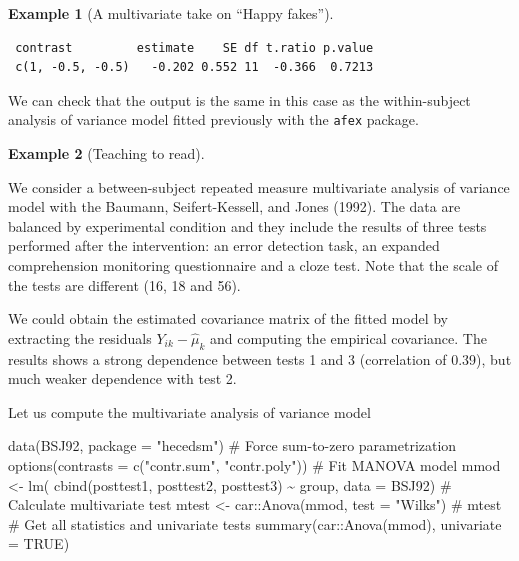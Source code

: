 \documentclass[
  11pt,
  letterpaper,
]{scrbook}
\newenvironment{Shaded}{\begin{snugshade}}{\end{snugshade}}
\newcommand{\AttributeTok}[1]{\textcolor[rgb]{0.40,0.45,0.13}{#1}}
\newcommand{\CommentTok}[1]{\textcolor[rgb]{0.37,0.37,0.37}{#1}}
\newcommand{\ConstantTok}[1]{\textcolor[rgb]{0.56,0.35,0.01}{#1}}
\newcommand{\FunctionTok}[1]{\textcolor[rgb]{0.28,0.35,0.67}{#1}}
\newcommand{\NormalTok}[1]{\textcolor[rgb]{0.00,0.23,0.31}{#1}}
\newcommand{\OtherTok}[1]{\textcolor[rgb]{0.00,0.23,0.31}{#1}}
\newcommand{\SpecialCharTok}[1]{\textcolor[rgb]{0.37,0.37,0.37}{#1}}
\newcommand{\StringTok}[1]{\textcolor[rgb]{0.13,0.47,0.30}{#1}}
\theoremstyle{definition}
\theoremstyle{definition}
\newtheorem{example}{Example}[chapter]
\theoremstyle{remark}
\begin{document}
\begin{example}[A multivariate take on ``Happy
fakes'']
\begin{verbatim}
 contrast         estimate    SE df t.ratio p.value
 c(1, -0.5, -0.5)   -0.202 0.552 11  -0.366  0.7213
\end{verbatim}

We can check that the output is the same in this case as the
within-subject analysis of variance model fitted previously with the
\texttt{afex} package.

\end{example}

\begin{example}[Teaching to
read]\protect\hypertarget{exm-baumann-multi}{}\label{exm-baumann-multi}

We consider a between-subject repeated measure multivariate analysis of
variance model with the Baumann, Seifert-Kessell, and Jones (1992). The
data are balanced by experimental condition and they include the results
of three tests performed after the intervention: an error detection
task, an expanded comprehension monitoring questionnaire and a cloze
test. Note that the scale of the tests are different (16, 18 and 56).

We could obtain the estimated covariance matrix of the fitted model by
extracting the residuals \(Y_{ik} - \widehat{\mu}_k\) and computing the
empirical covariance. The results shows a strong dependence between
tests 1 and 3 (correlation of 0.39), but much weaker dependence with
test 2.

Let us compute the multivariate analysis of variance model

\begin{Shaded}
\begin{Highlighting}[]
\FunctionTok{data}\NormalTok{(BSJ92, }\AttributeTok{package =} \StringTok{"hecedsm"}\NormalTok{)}
\CommentTok{\# Force sum{-}to{-}zero parametrization}
\FunctionTok{options}\NormalTok{(}\AttributeTok{contrasts =} \FunctionTok{c}\NormalTok{(}\StringTok{"contr.sum"}\NormalTok{, }\StringTok{"contr.poly"}\NormalTok{))}
\CommentTok{\# Fit MANOVA model}
\NormalTok{mmod }\OtherTok{\textless{}{-}} \FunctionTok{lm}\NormalTok{(}
  \FunctionTok{cbind}\NormalTok{(posttest1, posttest2, posttest3) }\SpecialCharTok{\textasciitilde{}}\NormalTok{ group,}
   \AttributeTok{data =}\NormalTok{ BSJ92)}
\CommentTok{\# Calculate multivariate test}
\NormalTok{mtest }\OtherTok{\textless{}{-}}\NormalTok{ car}\SpecialCharTok{::}\FunctionTok{Anova}\NormalTok{(mmod, }\AttributeTok{test =} \StringTok{"Wilks"}\NormalTok{)}
\CommentTok{\# mtest}
\CommentTok{\# Get all statistics and univariate tests}
\FunctionTok{summary}\NormalTok{(car}\SpecialCharTok{::}\FunctionTok{Anova}\NormalTok{(mmod), }\AttributeTok{univariate =} \ConstantTok{TRUE}\NormalTok{)}
\end{Highlighting}
\end{Shaded}


\end{example}
\end{document}
